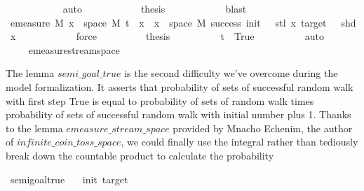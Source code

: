 \begin{isabellebody}
\ \ \ \ \ \ \ \ \ \ \isamarkupfalse%
\ auto\isanewline
\ \ \ \ \ \ \ \ \isamarkupfalse%
\ \isamarkupfalse%
\ {\isacharquery}{\kern0pt}thesis\isanewline
\ \ \ \ \ \ \ \ \ \ \isamarkupfalse%
\ blast\isanewline
\ \ \ \ \ \ \isamarkupfalse%
\isanewline
\ \ \ \ \ \ \isamarkupfalse%
\ \isamarkupfalse%
\ {\isachardoublequoteopen}emeasure\ M\ {\isacharbraceleft}{\kern0pt}x\ {\isasymin}\ space\ M{\isachardot}{\kern0pt}\ t\ {\isacharhash}{\kern0pt}{\isacharhash}{\kern0pt}\ x\ {\isasymin}\ {\isacharbraceleft}{\kern0pt}x\ {\isasymin}\ space\ M{\isachardot}{\kern0pt}\ success\ {\isacharparenleft}{\kern0pt}init\ {\isacharminus}{\kern0pt}\ {}{\isacharparenright}{\kern0pt}\ {\isacharparenleft}{\kern0pt}stl\ x{\isacharparenright}{\kern0pt}\ target\ {\isasymand}\ {\isasymnot}\ shd\ x{\isacharbraceright}{\kern0pt}{\isacharbraceright}{\kern0pt}\ {\isacharequal}{\kern0pt}\ {}{\isachardoublequoteclose}\isanewline
\ \ \ \ \ \ \ \ \isamarkupfalse%
\ force\isanewline
\ \ \ \ \ \ \isamarkupfalse%
\ \isamarkupfalse%
\ {\isacharquery}{\kern0pt}thesis\isanewline
\ \ \ \ \ \ \ \ \isamarkupfalse%
\ {\isacartoucheopen}t\ {\isacharequal}{\kern0pt}\ True{\isacartoucheclose}\isanewline
\ \ \ \ \ \ \ \ \isamarkupfalse%
\ auto\isanewline
\ \ \ \ \isamarkupfalse%
%
\endisatagproof
{\isafoldproof}%
%
\isadelimproof
\isanewline
%
\endisadelimproof
\isanewline
\ \ \ \ \isamarkupfalse%
{\isachardoublequoteopen}emeasure{\isacharunderscore}{\kern0pt}stream{\isacharunderscore}{\kern0pt}space{\isachardoublequoteclose}%
\begin{isamarkuptext}%
The lemma $semi\_goal\_true$ is the second difficulty we've overcome during the model formalization.
It asserts that probability of sets of successful random walk with first step True is equal to 
probability of sets of random walk times probability of sets of successful random walk with initial
number plus 1. Thanks to the lemma $emeasure\_stream\_space$ provided by Mnacho Echenim, the author of 
$infinite\_coin\_toss\_space$, we could finally use the integral rather than tediously break down the 
countable product to calculate the probability%
\end{isamarkuptext}\isamarkuptrue%
\isamarkupfalse%
\ semi{\isacharunderscore}{\kern0pt}goal{\isacharunderscore}{\kern0pt}true{\isacharcolon}{\kern0pt}\isanewline
\ \ \ init\ target\isanewline

\end{isabellebody}
